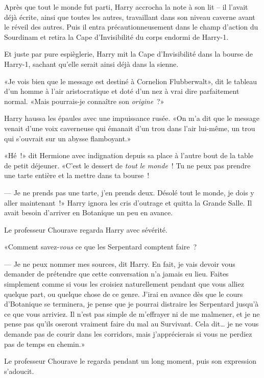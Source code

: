 Après que tout le monde fut parti, Harry accrocha la note à son lit -- il l'avait déjà écrite, ainsi que toutes les autres, travaillant dans son niveau caverne avant le réveil des autres. Puis il entra précautionneusement dans le champ d'action du Sourdinam et retira la Cape d'Invisibilité du corps endormi de Harry-1.

Et juste par pure espièglerie, Harry mit la Cape d'Invisibilité dans la bourse de Harry-1, sachant qu'elle serait ainsi déjà dans la sienne.

\later

«Je vois bien que le message est destiné à Cornelion Flubberwalt», dit le tableau d'un homme à l'air aristocratique et doté d'un nez à vrai dire parfaitement normal. «Mais pourrais-je connaître son \emph{origine}~?»

Harry haussa les épaules avec une impuissance rusée. «On m'a dit que le message venait d'une voix caverneuse qui émanait d'un trou dans l'air lui-même, un trou qui s'ouvrait sur un abysse flamboyant.»

\later

«Hé~!» dit Hermione avec indignation depuis sa place à l'autre bout de la table de petit déjeuner. «C'est le dessert de \emph{tout le monde}~! Tu ne peux pas prendre une tarte entière et la mettre dans ta bourse~!

--- Je ne prends pas une tarte, j'en prends deux. Désolé tout le monde, je dois y aller maintenant~!» Harry ignora les cris d'outrage et quitta la Grande Salle. Il avait besoin d'arriver en Botanique un peu en avance.

\later

Le professeur Chourave regarda Harry avec sévérité.

«Comment savez-\emph{vous} ce que les Serpentard comptent faire~?

--- Je ne peux nommer mes sources, dit Harry. En fait, je vais devoir vous demander de prétendre que cette conversation n'a jamais eu lieu. Faites simplement comme si vous les croisiez naturellement pendant que vous alliez quelque part, ou quelque chose de ce genre. J'irai en avance dès que le cours d'Botanique se terminera, je pense que je pourrai distraire les Serpentard jusqu'à ce que vous arriviez. Il n'est pas simple de m'effrayer ni de me malmener, et je ne pense pas qu'ils oseront vraiment faire du mal au Survivant. Cela dit… je ne vous demande pas de courir dans les corridors, mais j'apprécierais si vous ne perdiez pas de temps en chemin.»

Le professeur Chourave le regarda pendant un long moment, puis son expression s'adoucit.

